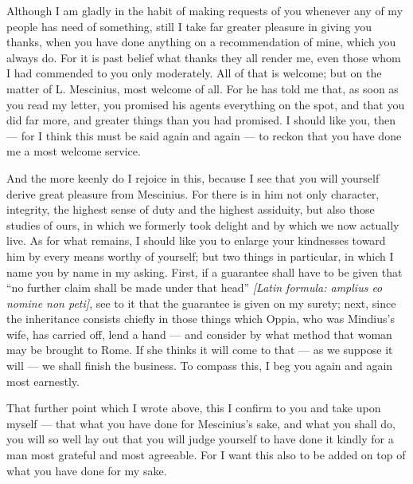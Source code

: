 

 Although I am gladly in the habit of making requests of you whenever any of my people has need of something, still I take far greater pleasure in giving you thanks, when you have done anything on a recommendation of mine, which you always do. For it is past belief what thanks they all render me, even those whom I had commended to you only moderately. All of that is welcome; but on the matter of L. Mescinius, most welcome of all. For he has told me that, as soon as you read my letter, you promised his agents everything on the spot, and that you did far more, and greater things than you had promised. I should like you, then --- for I think this must be said again and again --- to reckon that you have done me a most welcome service.

 And the more keenly do I rejoice in this, because I see that you will yourself derive great pleasure from Mescinius. For there is in him not only character, integrity, the highest sense of duty and the highest assiduity, but also those studies of ours, in which we formerly took delight and by which we now actually live. As for what remains, I should like you to enlarge your kindnesses toward him by every means worthy of yourself; but two things in particular, in which I name you by name in my asking. First, if a guarantee shall have to be given that ``no further claim shall be made under that head'' \textit{[Latin formula: amplius eo nomine non peti]}, see to it that the guarantee is given on my surety; next, since the inheritance consists chiefly in those things which Oppia, who was Mindius's wife, has carried off, lend a hand --- and consider by what method that woman may be brought to Rome. If she thinks it will come to that --- as we suppose it will --- we shall finish the business. To compass this, I beg you again and again most earnestly.

 That further point which I wrote above, this I confirm to you and take upon myself --- that what you have done for Mescinius's sake, and what you shall do, you will so well lay out that you will judge yourself to have done it kindly for a man most grateful and most agreeable. For I want this also to be added on top of what you have done for my sake.
